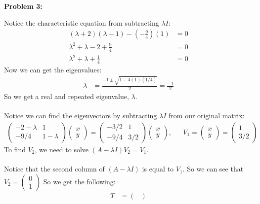 \documentclass[11pt]{article}
\newenvironment{problem}[1]{\textbf{Problem #1: }}{\newpage}
\begin{document}
\begin{problem}{3}
\begin{enumerate}[label = (\alph*)]
			Notice the characteristic equation from subtracting $\lambda I$:
			\begin{align*}
				(\lambda + 2)(\lambda - 1) - (-\frac{9}{4})(1) &= 0 \\
				\lambda^2 + \lambda - 2 + \frac{9}{4} &= 0 \\
				\lambda^2 + \lambda + \frac{1}{4} &= 0
			\end{align*}
			Now we can get the eigenvalues:
			\begin{align*}
				\lambda &= \frac{-1 \pm \sqrt{1 - 4(1)(1/4)}}{2} = \frac{-1}{2}
			\end{align*}
			So we get a real and repeated eigenvalue, $\lambda$.  
			\\ \\
			Notice we can find the eigenvectors by subtracting $\lambda I$ from our original matrix:
			\begin{align*}
			\begin{pmatrix}
				-2 - \lambda & 1 \\
				-9/4 & 1 - \lambda
			\end{pmatrix}\begin{pmatrix}
				x \\ y
			\end{pmatrix} = \begin{pmatrix}
				-3/2 & 1 \\
				-9/4 & 3/2
			\end{pmatrix}\begin{pmatrix}
				x \\ y
			\end{pmatrix}, && V_1 = \begin{pmatrix}
				x \\ y
			\end{pmatrix} = \begin{pmatrix}
				1 \\ 3 / 2
			\end{pmatrix} 
			\end{align*}  
			To find $V_2$, we need to solve $(A - \lambda I)V_2 = V_1$.
			\\ \\
			Notice that the second column of $(A - \lambda I)$ is equal to $V_1$.  So we can see that $V_2 = \begin{pmatrix}
				0 \\ 1
			\end{pmatrix}$ 
			So we get the following:
			\begin{align*}
				T &= \begin{pmatrix}

\end{pmatrix}
\end{align*}
\end{enumerate}
\end{problem}
\end{document}
